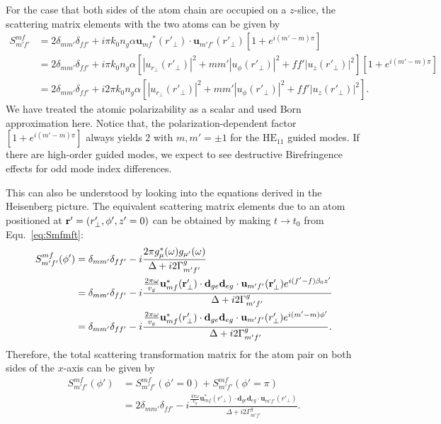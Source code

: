 \documentclass[preprint,aps,pra,onecolumn]{revtex4-1} %
\begin{document}
For the case that both sides of the atom chain are occupied on a $z$-slice, the scattering matrix elements with the two atoms can be given by
\begin{align}
\!\!\!\!\!\!S^{mf}_{m'f'} &= 2\delta_{mm'}\delta_{ff'} + i\pi k_0 n_g\alpha  {\mathbf{u}_{mf}}^*(r'_{\!\perp})\cdot \mathbf{u}_{m'f'}(r'_{\!\perp})[1+e^{i(m'-m)\pi}]\\
&= 2\delta_{mm'}\delta_{ff'} + i\pi k_0 n_g\alpha  \left[ |u_{r\!_\perp}(r'_{\!\perp})|^2+mm' |u_\phi(r'_{\!\perp})|^2+ff'|u_z(r'_\perp)|^2\right][1+e^{i(m'-m)\pi}]\\
&= 2\delta_{mm'}\delta_{ff'} + i2\pi k_0 n_g\alpha  \left[ |u_{r\!_\perp}(r'_{\!\perp})|^2+mm' |u_\phi(r'_{\!\perp})|^2+ff'|u_z(r'_\perp)|^2\right].
\end{align}
We have treated the atomic polarizability as a scalar and used Born approximation here. Notice that, the polarization-dependent factor $[1+e^{i(m'-m)\pi}]$ always yields $2$ with $m,m'=\pm 1$ for the $\mathrm{HE}_{11}$ guided modes. If there are high-order guided modes, we expect to see destructive Birefringence effects for odd mode index differences. 

This can also be understood by looking into the equations derived in the Heisenberg picture. The equivalent scattering matrix elements due to an atom positioned at $\mathbf{r}'=(r'_\perp,\phi',z'=0)$ can be obtained by making $t\rightarrow t_0$ from Equ.~\eqref{eq:Smfmft}:
\begin{align}\label{eq:Smfmfphi_Heisenberg}
S^{mf}_{m'f'}(\phi') &=\delta_{mm'}\delta_{ff'}-i\frac{2\pi g_\mu^*(\omega)g_{\mu'}(\omega)}{\Delta+i2\Gamma^g_{m'f'}}\\
&= \delta_{mm'}\delta_{ff'}-i\frac{ \frac{2\pi \omega}{v_g}\mathbf{u}^*_{mf}(\mathbf{r}'_\perp)\cdot\mathbf{d}_{ge} \mathbf{d}_{eg}\cdot\mathbf{u}_{m'f'}(\mathbf{r}'_\perp)e^{i(f'-f)\beta_0 z'}}{\Delta+i2\Gamma^g_{m'f'}}\\
&=  \delta_{mm'}\delta_{ff'}-i\frac{ \frac{2\pi \omega}{v_g}\mathbf{u}^*_{mf}(r'_\perp)\cdot\mathbf{d}_{ge} \mathbf{d}_{eg}\cdot\mathbf{u}_{m'f'}(r'_\perp)e^{i(m'-m)\phi'}}{\Delta+i2\Gamma^g_{m'f'}}.
\end{align}
Therefore, the total scattering transformation matrix for the atom pair on both sides of the $x$-axis can be given by
\begin{align}\label{eq:Smfmf2_Heisenberg}
S^{mf}_{m'f'}(\phi') &=S^{mf}_{m'f'}(\phi'=0)+S^{mf}_{m'f'}(\phi'=\pi)\\
&=  2\delta_{mm'}\delta_{ff'}-i\frac{ \frac{4\pi \omega}{v_g}\mathbf{u}^*_{mf}(r'_\perp)\cdot\mathbf{d}_{ge} \mathbf{d}_{eg}\cdot\mathbf{u}_{m'f'}(r'_\perp)}{\Delta+i2\Gamma^g_{m'f'}}.
\end{align}
\end{document}
